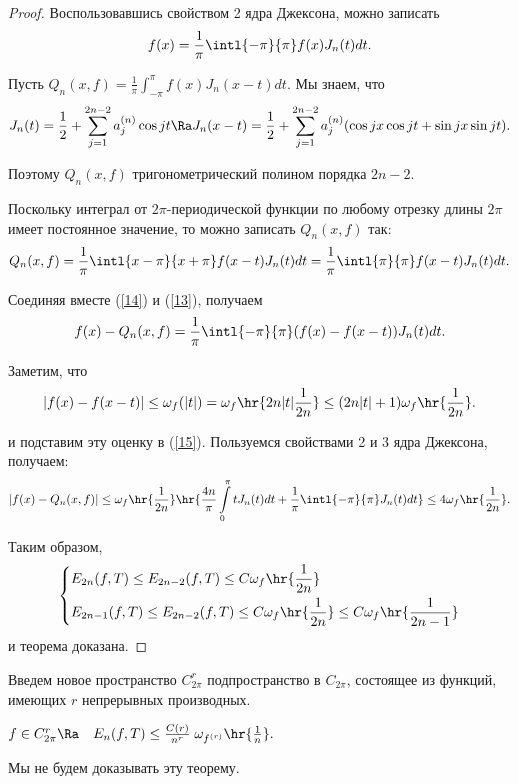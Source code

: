 \documentclass[a4paper]{article}
\begin{document}
\begin{proof}
  Воспользовавшись свойством 2 ядра
  Джексона, можно записать
  \begin{equation}\label{14}
    f(x)=\frac1{\pi}\intl{-\pi}{\pi}f(x)J_n(t)dt.
  \end{equation}

  Пусть $Q_n(x,f)=\frac1{\pi}\int_{-\pi}^{\pi}f(x)J_n(x-t)dt.$ Мы
  знаем, что
  $$J_n(t)=\frac12+\sum_{j=1}^{2n-2}a_j^{(n)}\cos jt\Ra
  J_n(x-t)=\frac12+\sum_{j=1}^{2n-2}a_j^{(n)}(\cos jx\cos jt+\sin
  jx\sin jt).$$

  Поэтому $Q_n(x,f)$ тригонометрический полином порядка $2n-2.$

  Поскольку интеграл от $2\pi$-периодической функции по любому
  отрезку длины $2\pi$ имеет постоянное значение, то можно записать
  $Q_n(x,f)$ так:
  \begin{equation}\label{13}
    Q_n(x,f)=\frac1{\pi}\intl{x-\pi}{x+\pi}f(x-t)J_n(t)dt=\frac1{\pi}\intl{\pi}{\pi}f(x-t)J_n(t)dt.
  \end{equation}

  Соединяя вместе (\ref{14}) и (\ref{13}), получаем
  \begin{equation}\label{15}
    f(x)-Q_n(x,f)=\frac1{\pi}\intl{-\pi}{\pi}(f(x)-f(x-t))J_n(t)dt.
  \end{equation}

  Заметим, что
  \begin{equation*}
    |f(x)-f(x-t)|\le\omega_f(|t|)=\omega_f\hr{2n|t|\frac1{2n}}\le(2n|t|+1)\omega_f\hr{\frac1{2n}}.
  \end{equation*}

  и подставим эту оценку в (\ref{15}). Пользуемся свойствами 2 и 3
  ядра Джексона, получаем:
  \begin{equation*}
    |f(x)-Q_n(x,f)|\le\omega_f\hr{\frac1{2n}}\hr{\frac{4n}{\pi}\int\limits_0^{\pi}tJ_n(t)dt+\frac1{\pi}\intl{-\pi}{\pi}J_n(t)dt}\le4\omega_f\hr{\frac1{2n}}.
  \end{equation*}

  Таким образом,
  $$\left\{\begin{aligned}
  &E_{2n}(f,T)\le E_{2n-2}(f,T)\le C\omega_f\hr{\frac1{2n}}\\
  &E_{2n-1}(f,T)\le E_{2n-2}(f,T)\le
  C\omega_f\hr{\frac1{2n}}\le
  C\omega_f\hr{\frac1{2n-1}}
  \end{aligned}
  \right.
  $$
  и теорема доказана.
\end{proof}

Введем новое пространство $C_{2\pi}^r$ подпространство в
$C_{2\pi}$, состоящее из функций, имеющих $r$ непрерывных
производных.
\begin{theorem} $f\in
C_{2\pi}^r\Ra\quad E_n(f,T)\le
\frac{C(r)}{n^r}\;\omega_{f^{(r)}}\hr{\frac1n}.$
\end{theorem}
Мы не будем доказывать эту теорему.
\end{document}
